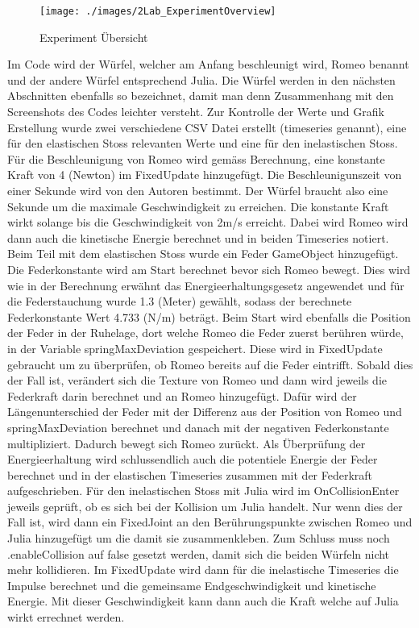 \documentclass[../main.tex]{subfiles}
\begin{document}
    \begin{figure}[H]
        \begin{center}
        \centerline{\texttt{[image: ./images/2Lab\_ExperimentOverview]}}
            \caption{Experiment Übersicht}
            \label{fig:2Lab_ExperimentOverview}
        \end{center}
    \end{figure}
Im Code wird der Würfel, welcher am Anfang beschleunigt wird, Romeo benannt und der andere Würfel entsprechend
Julia. Die Würfel werden in den nächsten Abschnitten ebenfalls so bezeichnet, damit man denn Zusammenhang mit den
Screenshots des Codes leichter versteht. Zur Kontrolle der Werte und Grafik Erstellung wurde zwei verschiedene
CSV Datei erstellt (timeseries genannt), eine für den elastischen Stoss relevanten Werte und eine für den inelastischen Stoss.
\newline
Für die Beschleunigung von Romeo wird gemäss Berechnung, eine konstante Kraft von 4 (Newton) im FixedUpdate hinzugefügt.
Die Beschleunigunszeit von einer Sekunde wird von den Autoren bestimmt.
Der Würfel braucht also eine Sekunde um die maximale Geschwindigkeit zu erreichen.
Die konstante Kraft wirkt solange bis die Geschwindigkeit von 2m/s erreicht.
Dabei wird Romeo wird dann auch die kinetische Energie berechnet und in beiden Timeseries notiert.
\newline
Beim Teil mit dem elastischen Stoss wurde ein Feder GameObject hinzugefügt. Die Federkonstante wird am Start berechnet
bevor sich Romeo bewegt. Dies wird wie in der Berechnung erwähnt das Energieerhaltungsgesetz angewendet und für die
Federstauchung wurde 1.3 (Meter) gewählt, sodass der berechnete Federkonstante Wert 4.733 (N/m) beträgt. Beim Start
wird ebenfalls die Position der Feder in der Ruhelage, dort welche Romeo die Feder zuerst berühren würde, in der
Variable springMaxDeviation gespeichert.
\newline
Diese wird in FixedUpdate gebraucht um zu überprüfen, ob Romeo bereits auf die Feder eintrifft.
Sobald dies der Fall ist, verändert sich die Texture von Romeo und dann wird jeweils die Federkraft darin
berechnet und an Romeo hinzugefügt. Dafür wird der Längenunterschied der Feder mit der Differenz aus der
Position von Romeo und springMaxDeviation berechnet und danach mit der negativen Federkonstante multipliziert.
Dadurch bewegt sich Romeo  zurückt. Als Überprüfung der Energieerhaltung wird schlussendlich auch die potentiele
Energie der Feder berechnet und in der elastischen Timeseries zusammen mit der Federkraft aufgeschrieben.
\newline
Für den inelastischen Stoss mit Julia wird im OnCollisionEnter jeweils geprüft, ob es sich bei der Kollision um
Julia handelt. Nur wenn dies der Fall ist, wird dann ein FixedJoint an den Berührungspunkte zwischen Romeo und
Julia hinzugefügt um die damit sie zusammenkleben. Zum Schluss muss noch .enableCollision auf false gesetzt werden,
damit sich die beiden Würfeln nicht mehr kollidieren.
\newline
Im FixedUpdate wird dann für die inelastische Timeseries die Impulse berechnet und die gemeinsame Endgeschwindigkeit
und kinetische Energie. Mit dieser Geschwindigkeit kann dann auch die Kraft welche auf Julia wirkt errechnet werden.
\end{document}
